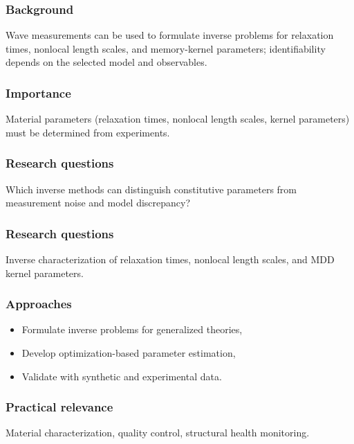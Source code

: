 \subsubsection{Background}

Wave measurements can be used to formulate inverse problems for relaxation times, nonlocal length scales, and memory-kernel parameters; identifiability depends on the selected model and observables.

\subsubsection{Importance}

Material parameters (relaxation times, nonlocal length scales, kernel parameters) must be determined from experiments.

\subsubsection{Research questions}

Which inverse methods can distinguish constitutive parameters from measurement noise and model discrepancy?

\subsubsection{Research questions}

Inverse characterization of relaxation times, nonlocal length scales, and MDD kernel parameters.

\subsubsection{Approaches}

\begin{itemize}
\item Formulate inverse problems for generalized theories,
\item Develop optimization-based parameter estimation,
\item Validate with synthetic and experimental data.
\end{itemize}

\subsubsection{Practical relevance}

Material characterization, quality control, structural health monitoring.

